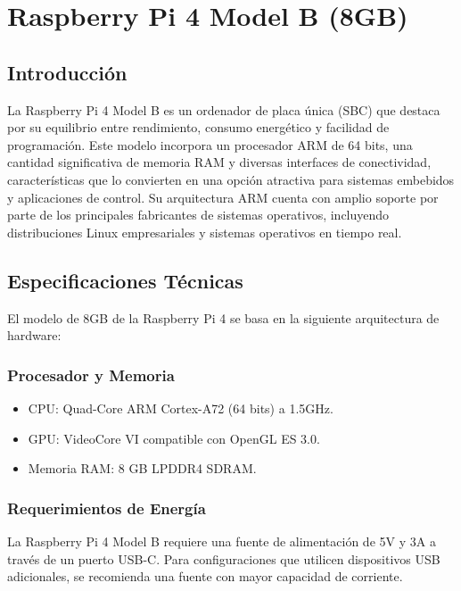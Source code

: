 \chapter{Raspberry Pi 4 Model B (8GB)}

\section{Introducción}
    La Raspberry Pi 4 Model B \cite{raspberrypi4} es un ordenador de placa única (SBC) que destaca por su equilibrio entre rendimiento, consumo energético y facilidad de programación. Este modelo incorpora un procesador ARM de 64 bits, una cantidad significativa de memoria RAM y diversas interfaces de conectividad, características que lo convierten en una opción atractiva para sistemas embebidos y aplicaciones de control. Su arquitectura ARM cuenta con amplio soporte por parte de los principales fabricantes de sistemas operativos, incluyendo distribuciones Linux empresariales y sistemas operativos en tiempo real.

\section{Especificaciones Técnicas}
    El modelo de 8GB de la Raspberry Pi 4 se basa en la siguiente arquitectura de hardware:

    \subsection{Procesador y Memoria}
    \begin{itemize}
        \item CPU: Quad-Core ARM Cortex-A72 (64 bits) a 1.5GHz.
        \item GPU: VideoCore VI compatible con OpenGL ES 3.0.
        \item Memoria RAM: 8 GB LPDDR4 SDRAM.
    \end{itemize}

    \subsection{Requerimientos de Energía}
    La Raspberry Pi 4 Model B requiere una fuente de alimentación de 5V y 3A a través de un puerto USB-C. Para configuraciones que utilicen dispositivos USB adicionales, se recomienda una fuente con mayor capacidad de corriente.

    \newpage
